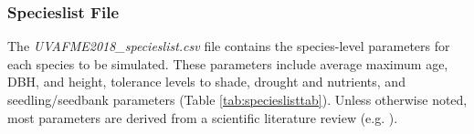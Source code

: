 \documentclass[a4paper, 12pt] {article}
\begin{document}
\begin{table}
\caption{Sitelist file parameters.}
\label{tab:sitelisttab}
\end{table}

\subsubsection{Specieslist File}
The \textit{UVAFME2018\_specieslist.csv} file contains the species-level parameters for each species to be simulated. These parameters include average maximum age, DBH, and height, tolerance levels to shade, drought and nutrients, and seedling/seedbank parameters (Table \ref{tab:specieslisttab}). Unless otherwise noted, most parameters are derived from a scientific literature review (e.g. ).
\end{document}
